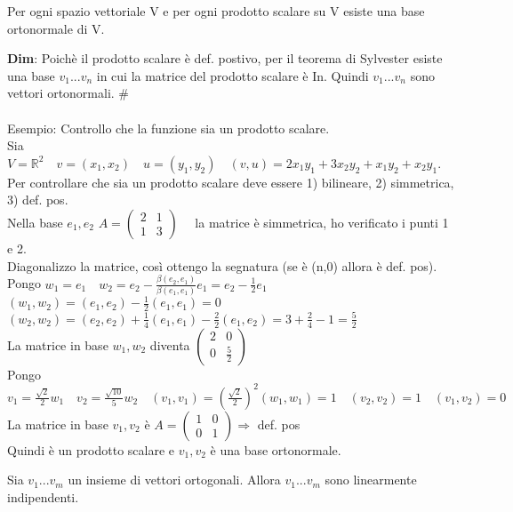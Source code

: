 \documentclass[12pt]{article}
\begin{document}
\begin{theorem}
    Per ogni spazio vettoriale V e per ogni prodotto scalare su V esiste una base ortonormale di V.
\end{theorem}
\textbf{Dim}: Poichè il prodotto scalare è def. postivo, per il teorema di Sylvester esiste una base $v_1...v_n$ in cui la matrice del prodotto scalare è In. Quindi $v_1...v_n$ sono vettori ortonormali. $\#$\\\\
Esempio: Controllo che la funzione sia un prodotto scalare.\\
Sia $V = \mathbb{R}^2\quad v = (x_1,x_2) \quad u = (y_1,y_2) \quad (v,u) = 2x_1y_1+3x_2y_2+x_1y_2+x_2y_1$.\\
Per controllare che sia un prodotto scalare deve essere 1) bilineare, 2) simmetrica, 3) def. pos.\\
Nella base $e_1, e_2$ $A=\begin{pmatrix}
    2 & 1\\
    1 & 3
\end{pmatrix}\quad$ la matrice è simmetrica, ho verificato i punti 1 e 2.\\
Diagonalizzo la matrice, così ottengo la segnatura (se è (n,0) allora è def. pos).\\
Pongo $w_1= e_1\quad w_2 =e_2-\frac{\beta(e_2,e_1)}{\beta(e_1,e_1)}e_1 = e_2-\frac{1}{2}e_1 $\\
$(w_1,w_2) = (e_1,e_2) - \frac{1}{2}(e_1,e_1) = 0$\\
$(w_2,w_2) = (e_2,e_2) + \frac{1}{4}(e_1,e_1)- \frac{2}{2}(e_1,e_2) = 3+\frac{2}{4}-1 = \frac{5}{2}$\\
La matrice in base $w_1, w_2$ diventa $\begin{pmatrix}
    2 & 0 \\
    0 & \frac{5}{2}
\end{pmatrix}$\\
Pongo $v_1 = \frac{\sqrt{2}}{2}w_1\quad v_2 = \frac{\sqrt{10}}{5}w_2\quad (v_1,v_1) = (\frac{\sqrt{2}}{2})^2(w_1,w_1) = 1 \quad (v_2,v_2) = 1\quad (v_1,v_2) = 0$\\
La matrice in base $v_1,v_2$ è $A=\begin{pmatrix}
    1 & 0\\
    0 & 1
\end{pmatrix} \Rightarrow$ def. pos\\
Quindi è un prodotto scalare e $v_1,v_2$ è una base ortonormale.
\begin{theorem}
    Sia $v_1...v_m$ un insieme di vettori ortogonali. Allora $v_1...v_m$ sono linearmente indipendenti.
\end{theorem}
\end{document}
